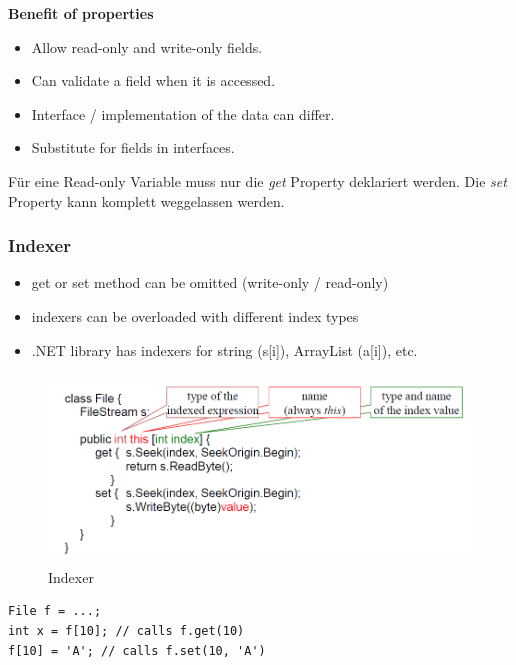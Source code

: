 \textbf{Benefit of properties}
\begin{multicols}{2}
\begin{itemize}
	\item Allow read-only and write-only fields.
	\item Can validate a field when it is accessed.
\end{itemize}

\columnbreak

\begin{itemize}
	\item Interface / implementation of the data can differ.
	\item Substitute for fields in interfaces.
\end{itemize}
\end{multicols}
Für eine Read-only Variable muss nur die \textit{get} Property deklariert werden. Die \textit{set} Property
kann komplett weggelassen werden.

\subsubsection{Indexer}
\begin{itemize}
	\item get or set method can be omitted (write-only / read-only)
	\item indexers can be overloaded with different index types
	\item .NET library has indexers for string (s[i]), ArrayList (a[i]), etc.
\end{itemize}

\begin{figure}[h]
	\centering
	\includegraphics[height=5cm, ]{images/CSharp/Indexer}
	\caption{Indexer}
\end{figure}

\begin{lstlisting}
File f = ...;
int x = f[10]; // calls f.get(10)
f[10] = 'A'; // calls f.set(10, 'A')
\end{lstlisting}


